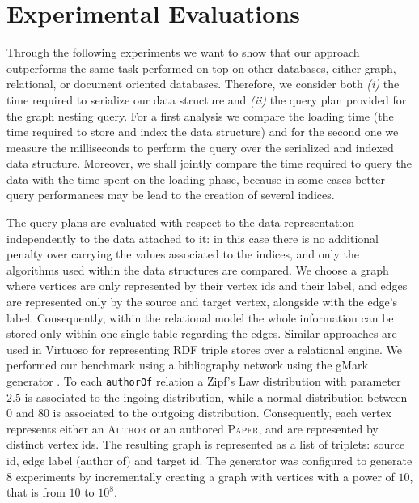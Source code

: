 \section{Experimental Evaluations}\label{sec:nestexpeval}
Through the following experiments we want to show that our approach outperforms the same task performed on top on other databases, either graph, relational, or document oriented databases. Therefore, we consider both \textit{(i)} the time required to serialize our data structure and \textit{(ii)} the query plan provided for the graph nesting query. For a first analysis we compare the loading time (the time required to store and index the data structure) and for the second one we measure the milliseconds to perform the query  over the serialized and indexed data structure. Moreover, we shall jointly compare the time required to query the data with the time spent on the loading phase, because in some cases better query performances may be lead to the creation of several indices.


The query plans are evaluated with respect to the data representation independently to the data attached to it: in this case there is no additional penalty over carrying the values associated to the indices, and only the algorithms used within the data structures are compared. We choose a graph where vertices are only represented by their vertex ids and their label, and edges are represented only by the source and target vertex, alongside with the edge's label. Consequently, within the relational model the whole information can be stored only within one single table regarding the edges. Similar approaches are used in Virtuoso for representing RDF triple stores over a relational engine. We performed our benchmark using  a bibliography network using the gMark generator \cite{BBCFLA17}. To each \texttt{authorOf} relation a Zipf's Law distribution with parameter $2.5$ is associated to the ingoing distribution, while a normal distribution between $0$ and $80$ is associated to the outgoing distribution. Consequently, each vertex represents either an \textsc{Author} or an authored \textsc{Paper}, and are represented by distinct vertex ids. The resulting graph is represented as a list of triplets: source id, edge label (author of) and target id. The generator was configured to generate $8$ experiments by incrementally creating a graph with vertices with a power of $10$, that is from $10$ to $10^8$.

